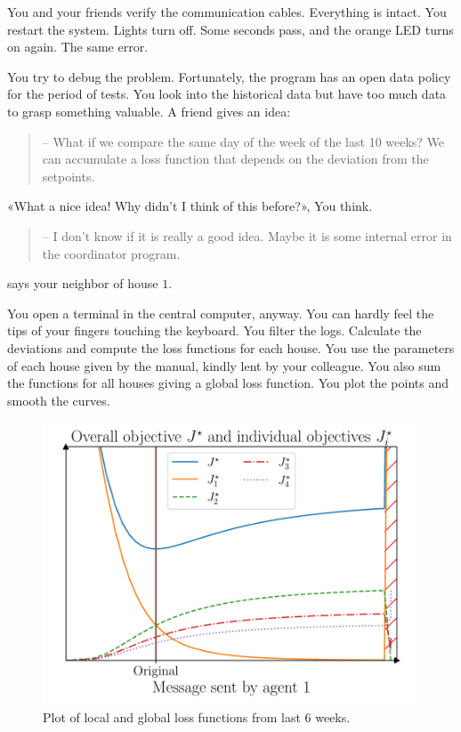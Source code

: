 \documentclass[../main.tex]{subfiles}
\begin{document}
You and your friends verify the communication cables.
Everything is intact. You restart the system.
Lights turn off. Some seconds pass, and the orange LED turns on again.
The same error.

You try to debug the problem.
Fortunately, the program has an open data policy for the period of tests.
You look into the historical data but have too much data to grasp something valuable.
A friend gives an idea:
\begin{quote}
  -- What if we compare the same day of the week of the last 10 weeks? We can accumulate a loss function that depends on the deviation from the setpoints.
\end{quote}

«What a nice idea! Why didn't I think of this before?», You think.
\begin{quote}
-- I don't know if it is really a good idea. Maybe it is some internal error in the coordinator program.
\end{quote}
says your neighbor of house $1$.

You open a terminal in the central computer, anyway.
You can hardly feel the tips of your fingers touching the keyboard.
You filter the logs. Calculate the deviations and compute the loss functions for each house. You use the parameters of each house given by the manual, kindly lent by your colleague.
You also sum the functions for all houses giving a global loss function.
You plot the points and smooth the curves.
\begin{figure}[H]
  \centering
  \includegraphics[width=.5\textwidth]{../img/qualitative_example.pdf}
  \caption{Plot of local and global loss functions from last 6 weeks.}\label{fig:change_in_j}
\end{figure}
\end{document}
